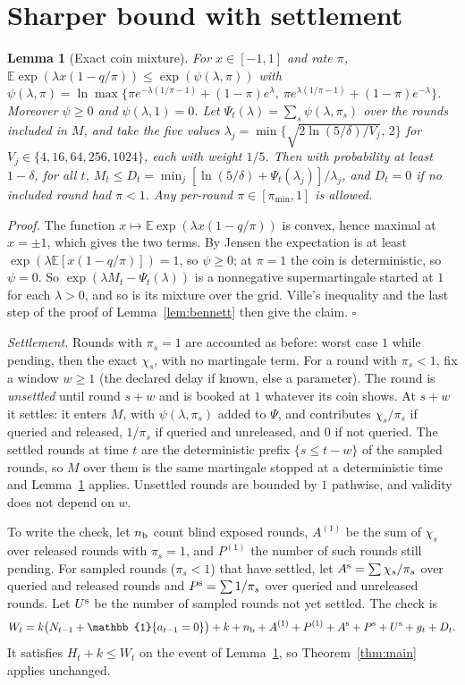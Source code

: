 \documentclass[10pt]{article}
\theoremstyle{plain}
\newtheorem{lemma}{Lemma}
\theoremstyle{definition}
\newcommand{\E}{\mathbb{E}}
\newcommand{\one}{\mathbb{1}}
\begin{document}
\section{Sharper bound with settlement}\label{app:v2}
\begin{lemma}[Exact coin mixture]\label{lem:coin}
For $x\in[-1,1]$ and rate $\pi$, $\E\exp(\lambda x(1-q/\pi))\le\exp(\psi(\lambda,\pi))$ with $\psi(\lambda,\pi)=\ln\max\{\pi e^{-\lambda(1/\pi-1)}+(1-\pi)e^{\lambda},\ \pi e^{\lambda(1/\pi-1)}+(1-\pi)e^{-\lambda}\}$. Moreover $\psi\ge0$ and $\psi(\lambda,1)=0$. Let $\Psi_t(\lambda)=\sum_s\psi(\lambda,\pi_s)$ over the rounds included in $M$, and take the five values $\lambda_j=\min\{\sqrt{2\ln(5/\delta)/V_j},\,2\}$ for $V_j\in\{4,16,64,256,1024\}$, each with weight $1/5$. Then with probability at least $1-\delta$, for all $t$, $M_t\le D_t=\min_j[\ln(5/\delta)+\Psi_t(\lambda_j)]/\lambda_j$, and $D_t=0$ if no included round had $\pi<1$. Any per-round $\pi\in[\pi_{\min},1]$ is allowed.
\end{lemma}
\emph{Proof.} The function $x\mapsto\E\exp(\lambda x(1-q/\pi))$ is convex, hence maximal at $x=\pm1$, which gives the two terms. By Jensen the expectation is at least $\exp(\lambda\E[x(1-q/\pi)])=1$, so $\psi\ge0$; at $\pi=1$ the coin is deterministic, so $\psi=0$. So $\exp(\lambda M_t-\Psi_t(\lambda))$ is a nonnegative supermartingale started at $1$ for each $\lambda>0$, and so is its mixture over the grid. Ville's inequality and the last step of the proof of Lemma~\ref{lem:bennett} then give the claim. $\square$

\emph{Settlement.} Rounds with $\pi_s=1$ are accounted as before: worst case $1$ while pending, then the exact $\chi_s$, with no martingale term. For a round with $\pi_s<1$, fix a window $w\ge1$ (the declared delay if known, else a parameter). The round is \emph{unsettled} until round $s+w$ and is booked at $1$ whatever its coin shows. At $s+w$ it settles: it enters $M$, with $\psi(\lambda,\pi_s)$ added to $\Psi$, and contributes $\chi_s/\pi_s$ if queried and released, $1/\pi_s$ if queried and unreleased, and $0$ if not queried. The settled rounds at time $t$ are the deterministic prefix $\{s\le t-w\}$ of the sampled rounds, so $M$ over them is the same martingale stopped at a deterministic time and Lemma~\ref{lem:coin} applies. Unsettled rounds are bounded by $1$ pathwise, and validity does not depend on $w$.

To write the check, let $n_{\rm b}$ count blind exposed rounds, $A^{(1)}$ be the sum of $\chi_s$ over released rounds with $\pi_s=1$, and $P^{(1)}$ the number of such rounds still pending. For sampled rounds ($\pi_s<1$) that have settled, let $A^{\rm s}=\sum\chi_s/\pi_s$ over queried and released rounds and $P^{\rm s}=\sum1/\pi_s$ over queried and unreleased rounds. Let $U^{\rm s}$ be the number of sampled rounds not yet settled. The check is
\[
W_t=k\bigl(N_{t-1}+\one\{a_{t-1}=0\}\bigr)+k+n_{\rm b}+A^{(1)}+P^{(1)}+A^{\rm s}+P^{\rm s}+U^{\rm s}+g_t+D_t .
\]
It satisfies $H_t+k\le W_t$ on the event of Lemma~\ref{lem:coin}, so Theorem~\ref{thm:main} applies unchanged.
\end{document}
